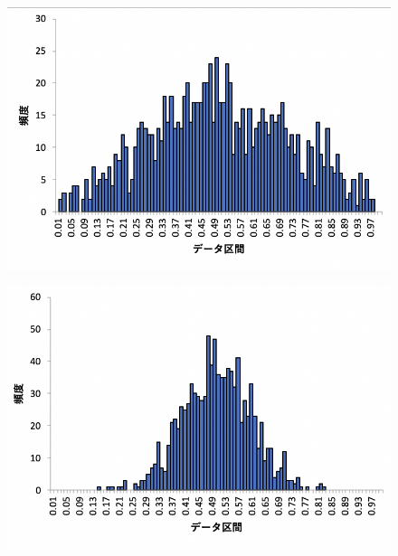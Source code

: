 \documentclass[12pt]{jarticle}
\begin{document}
\begin{figure}[h]
    \begin{center}
        \includegraphics[scale=0.7]{kadai4_2graph3.png}
    \end{center}
    \caption{}
\end{figure}
\begin{figure}[h]
    \begin{center}
        \includegraphics[scale=0.7]{kadai4_2graph4.png}
    \end{center}
    \caption{}
\end{figure}
\end{document}
